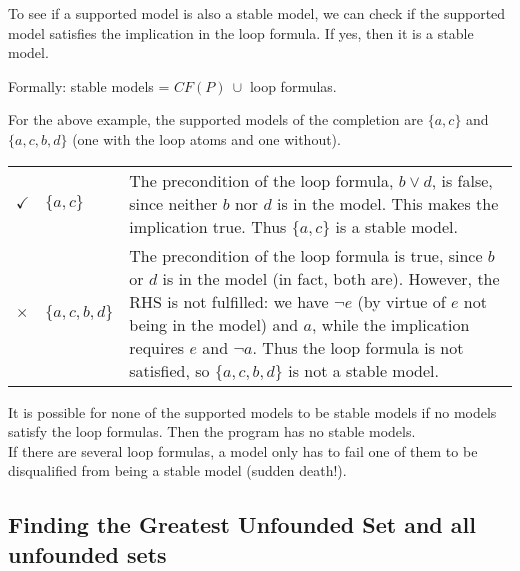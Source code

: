 \documentclass[9pt,a4paper,landscape]{article}
\begin{document}
{To see if a supported model is also a stable model, we can check if the supported model satisfies the implication in the loop formula.
If yes, then it is a stable model.

\vspace{\baselineskip}

Formally: stable models = $CF(P)\ \cup$ loop formulas.

\vspace{\baselineskip}

For the above example, the supported models of the completion are $\{a, c\}$ and $\{a, c, b, d\}$ (one with the loop atoms and one without).

\begin{center}
	\begin{tabular}{llp{20cm}}
		$\checkmark$ & $\{a, c\}$ & The precondition of the loop formula, $b \lor d$, is false, since neither $b$ nor $d$ is in the model. This makes the implication true. Thus $\{a, c\}$ is a stable model. \\
		$\times$ & $\{a, c, b, d\}$ & The precondition of the loop formula is true, since $b$ or $d$ is in the model (in fact, both are). However, the RHS is not fulfilled: we have $\neg e$ (by virtue of $e$ not being in the model) and $a$, while the implication requires $e$ and $\neg a$. Thus the loop formula is not satisfied, so $\{a, c, b, d\}$ is not a stable model.\\
	\end{tabular}
\end{center}

It is possible for none of the supported models to be stable models if no models satisfy the loop formulas. Then the program has no stable models.\\


If there are several loop formulas, a model only has to fail one of them to be disqualified from being a stable model (sudden death!).

\pagebreak


\subsection{Finding the Greatest Unfounded Set and all unfounded sets}
\label{subsec:unf}

}
\end{document}
